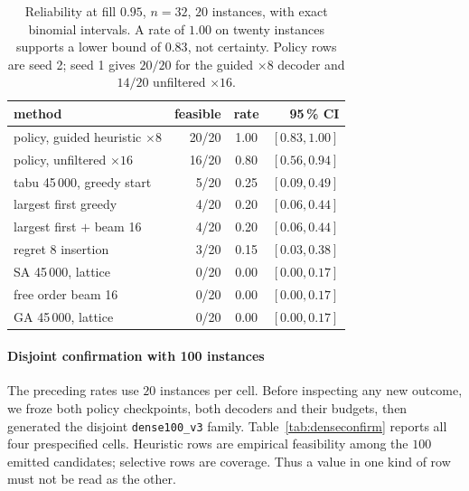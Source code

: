 \documentclass[preprint,12pt,authoryear]{elsarticle}
\begin{document}
\begin{table}[t]
\centering
\caption{Reliability at fill $0.95$, $n=32$, $20$ instances, with exact binomial
intervals. A rate of $1.00$ on twenty instances supports a lower bound of
$0.83$, not certainty. Policy rows are seed 2; seed 1 gives $20/20$ for the
guided $\times8$ decoder and $14/20$ unfiltered $\times16$.}
\label{tab:reliability}
\small
\begin{tabular}{@{}lrcr@{}}
\toprule
method & feasible & rate & 95\,\% CI \\
\midrule
policy, guided heuristic $\times8$  & 20/20 & 1.00 & $[0.83,1.00]$ \\
policy, unfiltered $\times16$       & 16/20 & 0.80 & $[0.56,0.94]$ \\
tabu 45\,000, greedy start          &  5/20 & 0.25 & $[0.09,0.49]$ \\
largest first greedy                &  4/20 & 0.20 & $[0.06,0.44]$ \\
largest first $+$ beam 16           &  4/20 & 0.20 & $[0.06,0.44]$ \\
regret 8 insertion                  &  3/20 & 0.15 & $[0.03,0.38]$ \\
SA 45\,000, lattice                 &  0/20 & 0.00 & $[0.00,0.17]$ \\
free order beam 16                  &  0/20 & 0.00 & $[0.00,0.17]$ \\
GA 45\,000, lattice                 &  0/20 & 0.00 & $[0.00,0.17]$ \\
\bottomrule
\end{tabular}
\end{table}

\paragraph{Disjoint confirmation with 100 instances}
The preceding rates use $20$ instances per cell. Before inspecting any new
outcome, we froze both policy checkpoints, both decoders and their budgets, then
generated the disjoint \texttt{dense100\_v3} family. Table~\ref{tab:denseconfirm}
reports all four prespecified cells. Heuristic rows are empirical feasibility
among the $100$ emitted candidates; selective rows are coverage. Thus a value in
one kind of row must not be read as the other.
\end{document}
